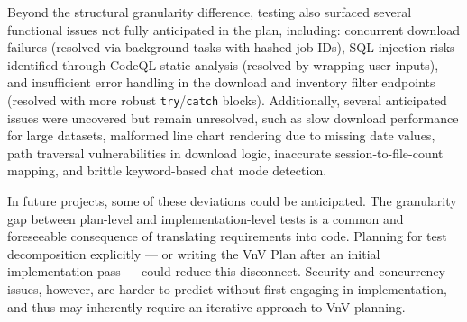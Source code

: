 \documentclass[12pt, titlepage]{article}
\begin{document}
\begin{enumerate}
  Beyond the structural granularity difference, testing also surfaced 
  several functional issues not fully anticipated in the plan, including: 
  concurrent download failures (resolved via background tasks with hashed 
  job IDs), SQL injection risks identified through CodeQL static analysis 
  (resolved by wrapping user inputs), and insufficient error handling in 
  the download and inventory filter endpoints (resolved with more robust 
  \texttt{try}/\texttt{catch} blocks). Additionally, several anticipated 
  issues were uncovered but remain unresolved, such as slow download 
  performance for large datasets, malformed line chart rendering due to 
  missing date values, path traversal vulnerabilities in download logic, 
  inaccurate session-to-file-count mapping, and brittle keyword-based 
  chat mode detection.

  In future projects, some of these deviations could be anticipated. The 
  granularity gap between plan-level and implementation-level tests is a 
  common and foreseeable consequence of translating requirements into code. 
  Planning for test decomposition explicitly --- or writing the VnV Plan 
  after an initial implementation pass --- could reduce this disconnect. 
  Security and concurrency issues, however, are harder to predict without 
  first engaging in implementation, and thus may inherently require an 
  iterative approach to VnV planning.

\end{enumerate}
\end{document}

